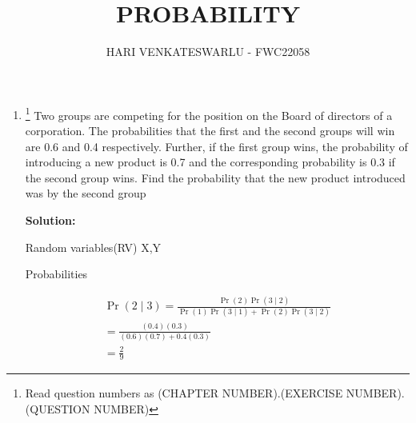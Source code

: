 \documentclass{article}
\providecommand{\pr}[1]{\ensuremath{\Pr\left(#1\right)}}
\newcommand{\solution}{\noindent \textbf{Solution: }}
\providecommand{\pr}[1]{\ensuremath{\Pr\left(#1\right)}}
\begin{document}
\title{PROBABILITY}
\author{\Large HARI VENKATESWARLU - FWC22058}
\date{}

\maketitle

\begin{enumerate}[label=13.\arabic{enumi}.\arabic{enumii}]%
\setcounter{enumi}{0}
\setcounter{enumii}{11}

\item \footnote{Read question numbers as (CHAPTER NUMBER).(EXERCISE NUMBER).(QUESTION NUMBER)} {Two groups are competing for the position
on the Board of directors of a corporation.
The probabilities that the first and the second
groups will win are 0.6 and 0.4 respectively.
Further, if the first group wins, the probability
of introducing a new product is 0.7 and the
corresponding probability is 0.3 if the second
group wins. Find the probability that the new
product introduced was by the second group}

	\solution\\
	\begin{table}[h]\centering
	
	\caption{Random variables(RV) X,Y}%
\end{table}

    \begin{table}[h]\centering
	
	\caption{Probabilities}%
    \end{table}
\begin{align}
&\pr{2 \mid 3} = \frac{\pr{2}\pr{3 \mid 2}}{\pr{1}\pr{3 \mid 1}+\pr{2}\pr{3 \mid 2}}&\\
&=\frac{(0.4)(0.3)}{(0.6)(0.7)+0.4(0.3)}&\\
&=\frac{2}{9}
\end{align}
\end{enumerate}
\end{document}
